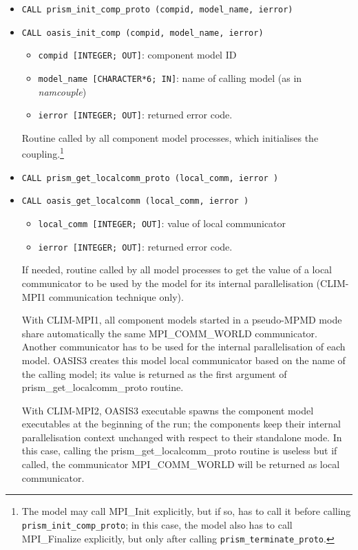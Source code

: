 \begin{itemize}

\item {\tt CALL prism\_init\_comp\_proto (compid, model\_name, ierror)} 
\item {\tt CALL oasis\_init\_comp        (compid, model\_name, ierror)} 

 \begin{itemize}
   \item {\tt compid [INTEGER; OUT]}: component model ID 
   \item {\tt model\_name [CHARACTER*6; IN]}: name of calling model (as in
  {\em namcouple}) 
   \item {\tt ierror [INTEGER; OUT]}: returned error code.
 \end{itemize}
 
Routine called by all component model processes, which initialises the
coupling.\footnote{The model may call MPI\_Init explicitly, but if so, has to
call it before calling {\tt prism\_init\_comp\_proto}; in this case, the
model also has to call MPI\_Finalize explicitly, but only after calling
{\tt prism\_terminate\_proto}.}

\item {\tt CALL prism\_get\_localcomm\_proto (local\_comm, ierror )}
\item {\tt CALL oasis\_get\_localcomm        (local\_comm, ierror )}

 \begin{itemize}
   \item {\tt local\_comm [INTEGER; OUT]}: value of local communicator
   \item {\tt ierror [INTEGER; OUT]}: returned error code.
  \end{itemize}

  If needed, routine called by all model processes  
  to get the value of a local communicator to be used by the
  model for its internal parallelisation (CLIM-MPI1 communication technique only). 

  With CLIM-MPI1, all component models started in a
  pseudo-MPMD mode share automatically the same MPI\_COMM\_WORLD
  communicator.  Another communicator has to be used for the internal
  parallelisation of each model. OASIS3 creates this model local
  communicator based on the name of the calling model; its value is returned
  as the first argument of prism\_get\_localcomm\_proto routine.

  With CLIM-MPI2, OASIS3 executable spawns the component model executables at the
  beginning of the run; 
  the components keep their internal parallelisation context unchanged 
  with respect to their standalone mode. In this case, calling the prism\_get\_localcomm\_proto 
  routine is useless but if called, the communicator MPI\_COMM\_WORLD will be returned as
  local communicator.

\end{itemize}

